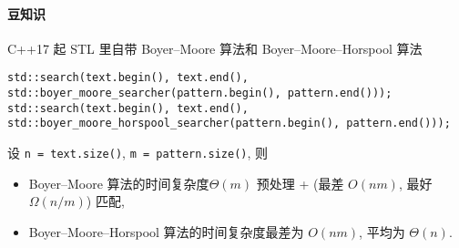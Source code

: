 \paragraph{豆知识}

C++17 起 STL 里自带 Boyer--Moore 算法和 Boyer--Moore--Horspool 算法

\begin{verbatim}
std::search(text.begin(), text.end(), std::boyer_moore_searcher(pattern.begin(), pattern.end()));
std::search(text.begin(), text.end(), std::boyer_moore_horspool_searcher(pattern.begin(), pattern.end()));
\end{verbatim}

设 \verb|n = text.size()|, \verb|m = pattern.size()|, 则

\begin{itemize}
    \item Boyer--Moore 算法的时间复杂度\(\Theta(m)\) 预处理 + (最差 \(O(nm)\), 最好 \(\Omega(n/m)\)) 匹配, \cite{enwiki:1185721721}
    \item Boyer--Moore--Horspool 算法的时间复杂度最差为 \(O(nm)\), 平均为 \(\Theta(n)\). \cite{enwiki:1136480391}
\end{itemize}
